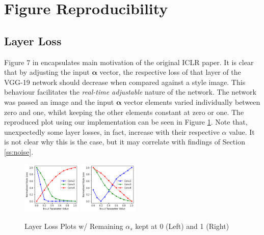 \documentclass{article} %
\begin{document}
\section{Figure Reproducibility}

\subsection{Layer Loss}

Figure 7 in \cite{babaeizadeh2018adjustable} encapsulates main motivation of the original ICLR paper. It is clear that by adjusting the input $\boldsymbol{\alpha}$ vector, the respective loss of that layer of the VGG-19 network should decrease when compared against a style image. This behaviour facilitates the \emph{real-time adjustable} nature of the network. The network was passed an image and the input $\boldsymbol{\alpha}$ vector elements varied individually between zero and one, whilst keeping the other elements constant at zero or one. The reproduced plot using our implementation can be seen in Figure \ref{fig:layer_loss}. Note that, unexpectedly some layer losses, in fact, increase with their respective $\alpha$ value. It is not clear why this is the case, but it may correlate with findings of Section \ref{ss:noise}.

\begin{figure}[h!]
    \centering
    \vspace{-1mm}
    \includegraphics[width=0.25\textwidth]{zeros.png}
    \hspace{0.5cm}
    \includegraphics[width=0.25\textwidth]{ones.png}
    \vspace{-4mm}
    \caption{Layer Loss Plots w/ Remaining $\alpha_s$ kept at 0 (Left) and 1 (Right)}
    \label{fig:layer_loss}
    \vspace{-5mm}
\end{figure}
\end{document}
